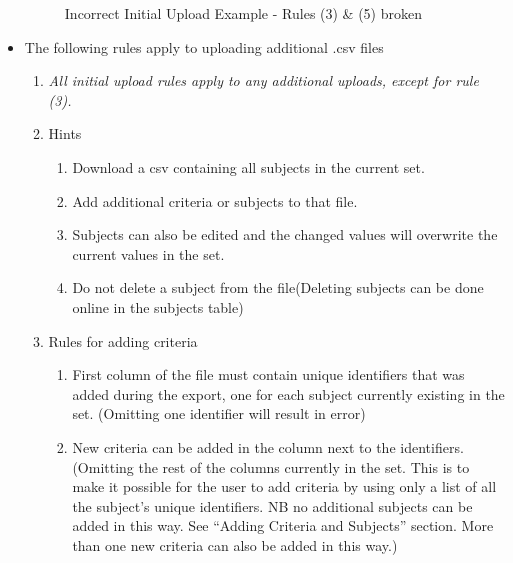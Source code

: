 \begin{itemize}
\begin{figure}[H]
	\caption{Incorrect Initial Upload Example - Rules (3) \& (5) broken}
\end{figure}
	\item The following rules apply to uploading additional .csv files
	\begin{enumerate}
		\item[] \textit{All initial upload rules apply to any additional uploads, except for rule (3).}
		\item Hints
		\begin{enumerate}
			\item Download a csv containing all subjects in the current set.
			\item Add additional criteria or subjects to that file. 
			\item Subjects can also be edited and the changed values will overwrite the current values in the set.
			\item Do not delete a subject from the file(Deleting subjects can be done online in the subjects table)
		\end{enumerate}
		\item Rules for adding criteria
		\begin{enumerate}
			\item First column of the file must contain unique identifiers that was added during the export, one for each subject currently existing in the set. (Omitting one identifier will result in error)
			\item New criteria can be added in the column next to the identifiers. (Omitting the rest of the columns 					currently in the set. This is to make it possible for the user to add criteria by using only a list of all the 					subject’s unique identifiers. NB no additional subjects can be added in this way. See ``Adding Criteria and 					Subjects'' section. More than one new criteria can also be added in this way.)
		\end{enumerate}
	

\end{enumerate}
\end{itemize}
